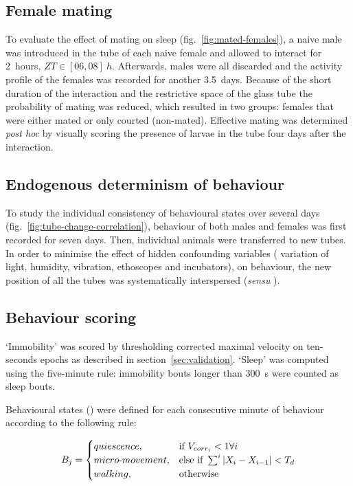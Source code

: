 \subsection{Female mating}
\label{subsec:mm-mating}
To evaluate the effect of mating on sleep (fig.~\ref{fig:mated-females}), a naive male was introduced in the tube of each naive female and allowed to interact for 2~hours, $ZT \in [06,08]~h$.
Afterwards, males were all discarded and the activity profile of the females was recorded for another 3.5~days.
Because of the short duration of the interaction and the restrictive space of the glass tube the probability of mating was reduced, which resulted in two groups: females that were either mated or only courted (non-mated).
Effective mating was determined \emph{post hoc} by visually scoring the presence of larvae in the tube four days after the interaction. 

\subsection{Endogenous determinism of behaviour}

\label{subsec:mm-endogenous-determ}

To study the individual consistency of behavioural states over several days (fig.~\ref{fig:tube-change-correlation}), behaviour of both males and females was first recorded for seven days.
Then, individual animals were transferred to new tubes.
In order to minimise the effect of hidden confounding variables (\eg{} variation of light, humidity, vibration, ethoscopes and incubators), on behaviour, the new position of all the tubes was systematically interspersed (\emph{sensu} \cite{hurlbert_pseudoreplication_1984}).


\subsection{Behaviour scoring}
\label{subsec:mm-behav-scoring}
`Immobility' was scored by thresholding corrected maximal velocity on ten-seconds epochs as described in section~\ref{sec:validation}.
`Sleep' was computed using the five-minute rule: immobility bouts longer than 300~s were counted as sleep bouts.

Behavioural states () were defined for each consecutive minute of behaviour according to the following rule:

\begin{align}
{
B_j = 
\begin{cases}
quiescence,            & \text{if } V_{corr_i} < 1\forall i\\
micro\text{-}movement, & \text{else if } \sum^{i}{|X_i - X_{i-1}|} < T_d\\
walking,               & \text{otherwise}
\end{cases}
}
\label{eq:behav-scoring}
\end{align}

